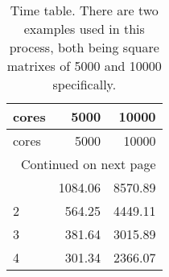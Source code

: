 \begin{longtable}{lrr}
	\caption[Time]{Time table. There are two examples used in this process, both being square matrixes of 5000 and 10000 specifically.}
	\label{tab:time}
	\\
	
\toprule
 cores & 5000 & 10000 \\
\midrule
\endfirsthead
\toprule
cores & 5000 & 10000 \\
\midrule
\endhead
\midrule
\multicolumn{3}{r}{Continued on next page} \\
\midrule
\endfoot
\bottomrule
\endlastfoot
1 & 1084.06 & 8570.89 \\
2 & 564.25 & 4449.11 \\
3 & 381.64 & 3015.89 \\
4 & 301.34 & 2366.07 \\
\end{longtable}

